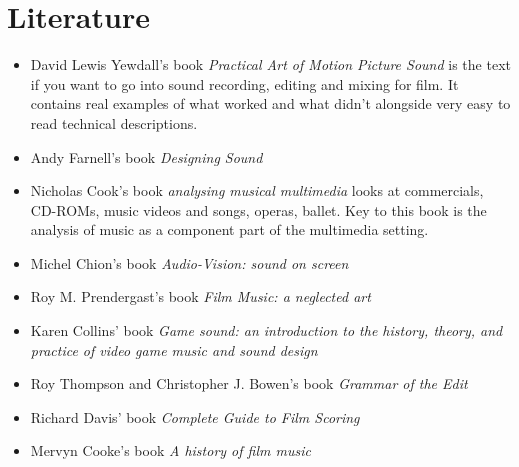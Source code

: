 
\chapter{Literature}
\label{literatures}

\begin{itemize}
\item David Lewis Yewdall's book \textit{Practical Art of Motion Picture Sound} \citep{yewdall2003practical} 
is the text if you want to go into sound recording, editing and mixing for film. It contains real examples of what worked and what didn't alongside very easy to read technical descriptions. 


\item Andy Farnell's book \textit{Designing Sound} \citep{farnell2010designing}

 
\item Nicholas Cook's book \textit{analysing musical multimedia} \citep{cook1998analysing} looks at commercials, CD-ROMs, music videos and songs, operas, ballet. Key to this book is the analysis of music as a component part of the multimedia setting. 


\item Michel Chion's book \textit{Audio-Vision: sound on screen} \citep{chion1990} 


\item Roy M. Prendergast's book \textit{Film Music: a neglected art} \citep{prendergast1992film} 

\item Karen Collins' book \textit{Game sound: an introduction to the history, theory, and practice of video game music and sound design} \citep{collins2008game}


\item Roy Thompson and Christopher J. Bowen's book \textit{Grammar of the Edit} \citep{thompson2009grammar} 

\item Richard Davis' book \textit{Complete Guide to Film Scoring} \citep{davis2010complete}

\item Mervyn Cooke's book \textit{A history of film music} \citep{cooke2008history}


\end{itemize}
